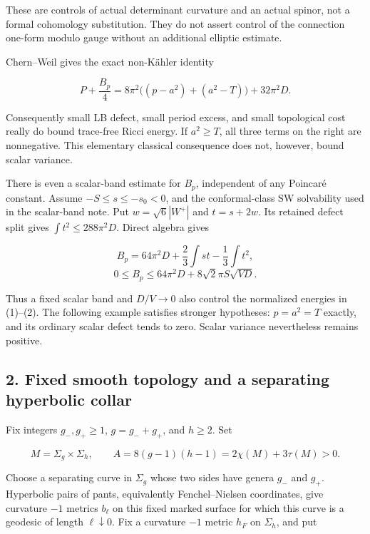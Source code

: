\documentclass[
  11pt,
]{article}
\begin{document}
These are controls of actual determinant curvature and an actual spinor,
not a formal cohomology substitution. They do not assert control of the
connection one-form modulo gauge without an additional elliptic
estimate.

Chern--Weil gives the exact non-Kähler identity

\[
 \boxed{P+\frac{B_p}{4}
 =8\pi^2\bigl((p-a^2)+(a^2-T)\bigr)+32\pi^2D.}
 \tag{3}
\]

Consequently small LB defect, small period excess, and small topological
cost really do bound trace-free Ricci energy. If \(a^2\ge T\), all three
terms on the right are nonnegative. This elementary classical
consequence does not, however, bound scalar variance.

There is even a scalar-band estimate for \(B_p\), independent of any
Poincaré constant. Assume \(-S\le s\le-s_0<0\), and the conformal-class
SW solvability used in the scalar-band note. Put \(w=\sqrt6|W^+|\) and
\(t=s+2w\). Its retained defect split gives \(\int t^2\le288\pi^2D\).
Direct algebra gives

\[
 B_p=64\pi^2D+\frac23\int st-\frac13\int t^2,
\] \[
 \boxed{0\le B_p\le64\pi^2D+8\sqrt2\pi S\sqrt{VD}.}
 \tag{4}
\]

Thus a fixed scalar band and \(D/V\to0\) also control the normalized
energies in (1)--(2). The following example satisfies stronger
hypotheses: \(p=a^2=T\) exactly, and its ordinary scalar defect tends to
zero. Scalar variance nevertheless remains positive.

\hypertarget{fixed-smooth-topology-and-a-separating-hyperbolic-collar}{%
\subsection{2. Fixed smooth topology and a separating hyperbolic
collar}\label{fixed-smooth-topology-and-a-separating-hyperbolic-collar}}

Fix integers \(g_-,g_+\ge1\), \(g=g_-+g_+\), and \(h\ge2\). Set

\[
 M=\Sigma_g\times\Sigma_h,
 \qquad A=8(g-1)(h-1)=2\chi(M)+3\tau(M)>0.
\]

Choose a separating curve in \(\Sigma_g\) whose two sides have genera
\(g_-\) and \(g_+\). Hyperbolic pairs of pants, equivalently
Fenchel--Nielsen coordinates, give curvature \(-1\) metrics \(b_\ell\)
on this fixed marked surface for which this curve is a geodesic of
length \(\ell\downarrow0\). Fix a curvature \(-1\) metric \(h_F\) on
\(\Sigma_h\), and put
\end{document}
